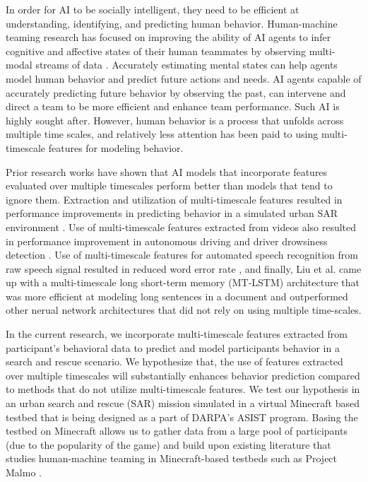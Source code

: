\documentclass{article}
\begin{document}
In order for AI to be socially intelligent, they need to be efficient at
understanding, identifying, and predicting human behavior. 
Human-machine teaming research has focused on improving the ability of 
AI agents to infer cognitive and affective states of their human teammates 
by observing multi-modal streams of data \citep{tra_hierarchical_nodate}. 
Accurately estimating mental states can help agents model human behavior 
and predict future actions and needs. AI agents capable of accurately 
predicting future behavior by observing the past, can intervene and 
direct a team to be more efficient and enhance team performance. 
Such AI is highly sought after. However, human behavior is a process 
that unfolds across multiple time scales, and relatively less attention 
has been paid to using multi-timescale features for modeling behavior.

Prior research works have shown that AI models that incorporate features 
evaluated over multiple timescales perform better than models that tend to 
ignore them. Extraction and utilization of multi-timescale features resulted in
performance improvements in predicting behavior in a simulated urban SAR environment
\citep{tra_hierarchical_nodate}. Use of multi-timescale features extracted from videos
also resulted in performance improvement in autonomous driving
\citep{chauvin_hierarchical_2018} and driver drowsiness detection
\citep{massoz_multi-timescale_2018}. Use of multi-timescale features for 
automated speech recognition from raw speech signal resulted in reduced word error 
rate \citep{takeda_multi-timescale_2018}, and finally, Liu et al. 
\citet{liu_multi-timescale_2015} came up with a multi-timescale long short-term 
memory (MT-LSTM) architecture that was more efficient at modeling long sentences
in a document and outperformed other nerual network architectures that did not
rely on using multiple time-scales.

In the current research, we incorporate multi-timescale features extracted from
participant’s behavioral data to predict and model participants behavior in a 
search and rescue scenario. 
We hypothesize that, the use of features extracted over multiple
timescales will substantially enhances behavior prediction compared to 
methods that do not utilize multi-timescale features. We test our hypothesis in 
an urban search and rescue (SAR) mission simulated in a virtual Minecraft based 
testbed that is being designed as a part of DARPA’s ASIST program. 
Basing the testbed on Minecraft allows us to gather data from a large pool of 
participants (due to the popularity of the game) and build upon existing literature 
that studies human-machine teaming in Minecraft-based testbeds such as Project 
Malmo \citep{johnson_malmo_nodate}.
\end{document}
